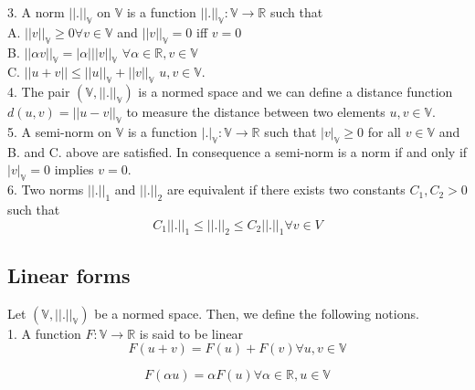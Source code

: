 \documentclass[a4paper,openany]{book}
\begin{document}
\begin{appendices}
3. A norm $||.||_\mathbb{V}$ on $\mathbb{V}$ is a function $||.||_\mathbb{V} : \mathbb{V} \rightarrow \mathbb{R}$ such that\\ 

A. $||v||_\mathbb{V} \geq 0 \forall v \in \mathbb{V}$ and $||v||_\mathbb{V} = 0$ iff $v=0$\\
B. $||\alpha v||_\mathbb{V} = |\alpha| ||v||_\mathbb{V}$  $\forall \alpha \in \mathbb{R}, v \in \mathbb{V}$\\
C. $||u+v|| \leq ||u||_\mathbb{V} + ||v||_\mathbb{V}$ $u,v \in \mathbb{V}$.\\

4. The pair $(\mathbb{V},||.||_\mathbb{V})$ is a normed space and we can define a distance function $d(u,v) = ||u-v||_\mathbb{V}$ to measure the distance between two elements $u,v \in \mathbb{V}$.\\

5. A semi-norm on $\mathbb{V}$ is a function $|.|_\mathbb{V} : \mathbb{V} \rightarrow \mathbb{R}$ such that $|v|_\mathbb{V} \geq 0$ for all $v \in \mathbb{V}$ and B. and C. above are satisfied. In consequence a semi-norm is a norm if and only if $|v|_\mathbb{V} = 0$ implies  $v = 0$.\\

6. Two norms $||.||_1$ and $||.||_2$ are equivalent if there exists two constants $C_1,C_2 > 0$ such that \\

\begin{equation} \label{norm_equivalent}
C_1||.||_1 \leq ||.||_2 \leq C_2 ||.||_1 \forall v \in V
\end{equation}

\subsection{Linear forms}

Let $(\mathbb{V,||.||_\mathbb{V}})$ be a normed space. Then, we define the following notions.\\

1. A function $F : \mathbb{V} \rightarrow \mathbb{R}$ is said to be linear
\begin{equation} 
F(u+v) = F(u) + F(v) \forall u,v \in \mathbb{V} 
\end{equation}

\begin{equation} 
F(\alpha u) = \alpha F(u) \forall \alpha \in \mathbb{R}, u \in \mathbb{V}
\end{equation}


\end{appendices}
\end{document}
